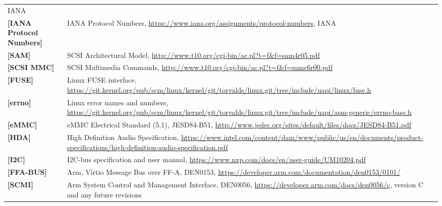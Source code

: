 \begin{longtable}{l p{5in}}
	IANA\\
	\label{intro:IANA Protocol Numbers}\textbf{[IANA Protocol Numbers]} &
	IANA Protocol Numbers,
	\newline\url{https://www.iana.org/assignments/protocol-numbers},
	IANA\\
	\label{intro:SAM}\textbf{[SAM]} &
        SCSI Architectural Model,
        \newline\url{http://www.t10.org/cgi-bin/ac.pl?t=f&f=sam4r05.pdf}\\
	\label{intro:SCSI MMC}\textbf{[SCSI MMC]} &
        SCSI Multimedia Commands,
        \newline\url{http://www.t10.org/cgi-bin/ac.pl?t=f&f=mmc6r00.pdf}\\
	\label{intro:FUSE}\textbf{[FUSE]} &
	Linux FUSE interface,
	\newline\url{https://git.kernel.org/pub/scm/linux/kernel/git/torvalds/linux.git/tree/include/uapi/linux/fuse.h}\\
	\label{intro:errno}\textbf{[errno]} &
	Linux error names and numbers,
	\newline\url{https://git.kernel.org/pub/scm/linux/kernel/git/torvalds/linux.git/tree/include/uapi/asm-generic/errno-base.h}\\
        \label{intro:eMMC}\textbf{[eMMC]} &
        eMMC Electrical Standard (5.1), JESD84-B51,
        \newline\url{http://www.jedec.org/sites/default/files/docs/JESD84-B51.pdf}\\
	\label{intro:HDA}\textbf{[HDA]} &
	High Definition Audio Specification,
	\newline\url{https://www.intel.com/content/dam/www/public/us/en/documents/product-specifications/high-definition-audio-specification.pdf}\\
	\label{intro:I2C}\textbf{[I2C]} &
	I2C-bus specification and user manual,
	\newline\url{https://www.nxp.com/docs/en/user-guide/UM10204.pdf}\\
	\label{intro:FFA-BUS}\textbf{[FFA-BUS]} &
	Arm, Virtio Message Bus over FF-A, DEN0153,
	\newline\url{https://developer.arm.com/documentation/den0153/0101/}\\
	\label{intro:SCMI}\textbf{[SCMI]} &
	Arm System Control and Management Interface, DEN0056,
	\newline\url{https://developer.arm.com/docs/den0056/c}, version C and any future revisions\\

\end{longtable}

